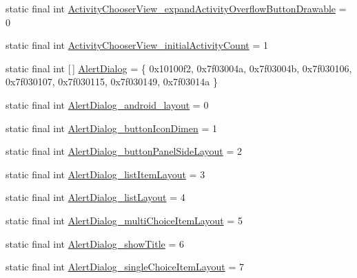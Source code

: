 \begin{DoxyCompactItemize}
static final int \mbox{\hyperlink{classandroid_1_1support_1_1v7_1_1appcompat_1_1_r_1_1styleable_a57d782294bc85a6841b5827f7d22e221}{Activity\+Chooser\+View\+\_\+expand\+Activity\+Overflow\+Button\+Drawable}} = 0
\item 
static final int \mbox{\hyperlink{classandroid_1_1support_1_1v7_1_1appcompat_1_1_r_1_1styleable_af5fce8154e0c1de563d94e6b59316ea8}{Activity\+Chooser\+View\+\_\+initial\+Activity\+Count}} = 1
\item 
static final int \mbox{[}$\,$\mbox{]} \mbox{\hyperlink{classandroid_1_1support_1_1v7_1_1appcompat_1_1_r_1_1styleable_a52dcd4f818920ef336f5b8033a2b34c1}{Alert\+Dialog}} = \{ 0x10100f2, 0x7f03004a, 0x7f03004b, 0x7f030106, 0x7f030107, 0x7f030115, 0x7f030149, 0x7f03014a \}
\item 
static final int \mbox{\hyperlink{classandroid_1_1support_1_1v7_1_1appcompat_1_1_r_1_1styleable_a3ba92cfe097b7f2eb3bf09db564da66a}{Alert\+Dialog\+\_\+android\+\_\+layout}} = 0
\item 
static final int \mbox{\hyperlink{classandroid_1_1support_1_1v7_1_1appcompat_1_1_r_1_1styleable_a22ef71ab341018a8216928d1a332c3fb}{Alert\+Dialog\+\_\+button\+Icon\+Dimen}} = 1
\item 
static final int \mbox{\hyperlink{classandroid_1_1support_1_1v7_1_1appcompat_1_1_r_1_1styleable_ac6cb6a756969c7cd5147564f0e743131}{Alert\+Dialog\+\_\+button\+Panel\+Side\+Layout}} = 2
\item 
static final int \mbox{\hyperlink{classandroid_1_1support_1_1v7_1_1appcompat_1_1_r_1_1styleable_a3d97cbf99f764229526d22f3c734187e}{Alert\+Dialog\+\_\+list\+Item\+Layout}} = 3
\item 
static final int \mbox{\hyperlink{classandroid_1_1support_1_1v7_1_1appcompat_1_1_r_1_1styleable_afb0edb41ca6aa8279e7047879a7e31ba}{Alert\+Dialog\+\_\+list\+Layout}} = 4
\item 
static final int \mbox{\hyperlink{classandroid_1_1support_1_1v7_1_1appcompat_1_1_r_1_1styleable_ae1e8a669920f8a567b5f718033319753}{Alert\+Dialog\+\_\+multi\+Choice\+Item\+Layout}} = 5
\item 
static final int \mbox{\hyperlink{classandroid_1_1support_1_1v7_1_1appcompat_1_1_r_1_1styleable_a0c73c72de42446c024b882c15590bd62}{Alert\+Dialog\+\_\+show\+Title}} = 6
\item 
static final int \mbox{\hyperlink{classandroid_1_1support_1_1v7_1_1appcompat_1_1_r_1_1styleable_a9e188e09ee3e99d0885738d1480b0d1e}{Alert\+Dialog\+\_\+single\+Choice\+Item\+Layout}} = 7
\item 

\end{DoxyCompactItemize}
